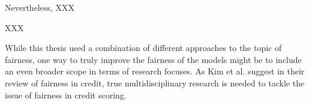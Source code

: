 Nevertheless, XXX


XXX

While this thesis used a combination of different approaches to the topic of fairness, one way to truly improve the fairness of the models might be to include an even broader scope in terms of research focuses.
As Kim et al. \parencite{Kim2023} suggest in their review of fairness in credit, true multidisciplinary research is needed to tackle the issue of fairness in credit scoring.